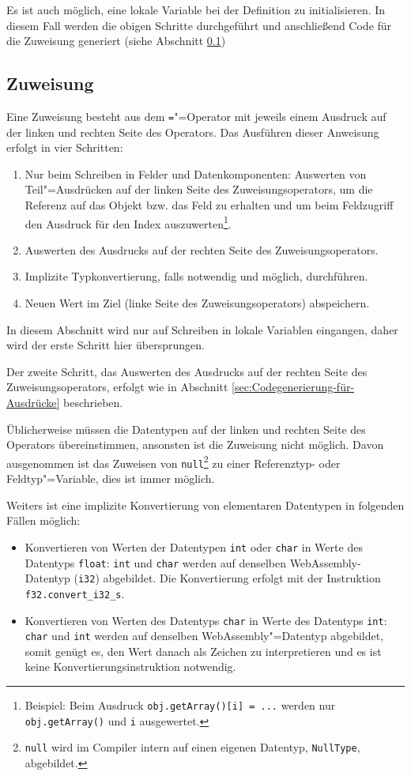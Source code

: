 Es ist auch möglich, eine lokale Variable bei der Definition zu initialisieren. In diesem Fall werden die obigen Schritte durchgeführt und anschließend Code für die Zuweisung generiert (siehe Abschnitt \ref{subsec:Zuweisung})

\subsection{Zuweisung}
\label{subsec:Zuweisung}
Eine Zuweisung besteht aus dem \lstinline{=}"=Operator mit jeweils einem Ausdruck auf der linken und rechten Seite des Operators. Das Ausführen dieser Anweisung erfolgt in vier Schritten:
\begin{enumerate}
    \item Nur beim Schreiben in Felder und Datenkomponenten: Auswerten von Teil"=Ausdrücken auf der linken Seite des Zuweisungsoperators, um die Referenz auf das Objekt bzw. das Feld zu erhalten und um beim Feldzugriff den Ausdruck für den Index auszuwerten\footnote{Beispiel: Beim Ausdruck \lstinline{obj.getArray()[i] = ...} werden nur \lstinline{obj.getArray()} und \lstinline{i} ausgewertet.}.
    \item Auswerten des Ausdrucks auf der rechten Seite des Zuweisungsoperators.
    \item Implizite Typkonvertierung, falls notwendig und möglich, durchführen.
    \item Neuen Wert im Ziel (linke Seite des Zuweisungsoperators) abspeichern. 
\end{enumerate}

In diesem Abschnitt wird nur auf Schreiben in lokale Variablen eingangen, daher wird der erste Schritt hier übersprungen.

Der zweite Schritt, das Auswerten des Ausdrucks auf der rechten Seite des Zuweisungsoperators, erfolgt wie in Abschnitt \ref{sec:Codegenerierung-für-Ausdrücke} beschrieben.

Üblicherweise müssen die Datentypen auf der linken und rechten Seite des Operators übereinstimmen, ansonsten ist die Zuweisung nicht möglich. Davon ausgenommen ist das Zuweisen von \lstinline{null}\footnote{\lstinline{null} wird im Compiler intern auf einen eigenen Datentyp, \lstinline{NullType}, abgebildet.} zu einer Referenztyp- oder Feldtyp"=Variable, dies ist immer möglich.

\pagebreak
Weiters ist eine implizite Konvertierung von elementaren Datentypen in folgenden Fällen möglich:
\begin{itemize}
    \item Konvertieren von Werten der Datentypen \lstinline{int} oder \lstinline{char} in Werte des Datentyps \lstinline{float}: \lstinline{int} und \lstinline{char} werden auf denselben WebAssembly-Datentyp (\lstinline{i32}) abgebildet. Die Konvertierung erfolgt mit der Instruktion \lstinline{f32.convert_i32_s}.
    \item Konvertieren von Werten des Datentyps \lstinline{char} in Werte des Datentyps \lstinline{int}: \lstinline{char} und \lstinline{int} werden auf denselben WebAssembly"=Datentyp abgebildet, somit genügt es, den Wert danach als Zeichen zu interpretieren und es ist keine Konvertierungsinstruktion notwendig.
\end{itemize}

